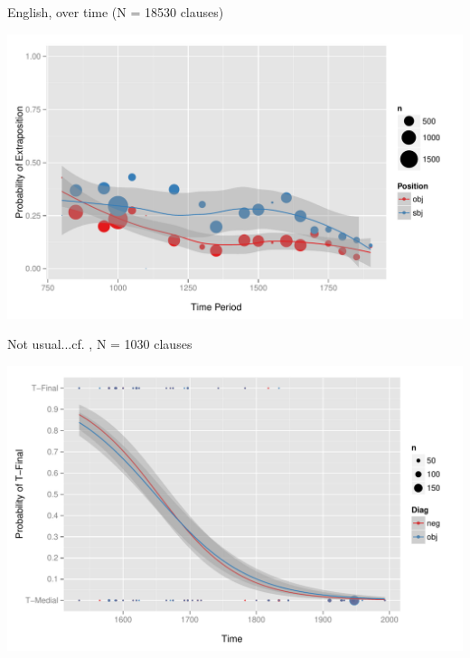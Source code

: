 \documentclass[hyperref={pdfpagelabels=false}]{beamer}
\begin{document}
\begin{frame}{English, over time (N = 18530 clauses)}

\begin{center}
\includegraphics[width=1.1\textwidth]{exSbjObjYearBinned50Loessymeb.pdf}
\end{center}
\end{frame}

\begin{frame}{Not usual...cf. \citet{wallenberg2013}, N = 1030 clauses}

\begin{center}
\includegraphics[width=1.1\textwidth]{yiddishLogistic.pdf}
\end{center}
\end{frame}
\end{document}
